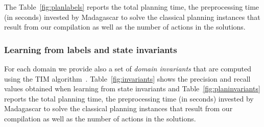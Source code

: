 \documentclass{article}
\begin{document}
The Table~\ref{fig:planlabels} reports the total planning time, the preprocessing time (in seconds) invested by {\sc Madagascar} to solve the classical planning instances that result from our compilation as well as the number of actions in the solutions. 


\subsubsection{Learning from labels and state invariants}
For each domain we provide also a set of {\em domain invariants} that are computed using the {\sc TIM} algorithm~\cite{fox:TIM:JAIR1998}. Table~\ref{fig:invariants} shows the precision and recall values obtained when learning from state invariants and Table~\ref{fig:planinvariants} reports the total planning time, the preprocessing time (in seconds) invested by {\sc Madagascar} to solve the classical planning instances that result from our compilation as well as the number of actions in the solutions. 
\end{document}
